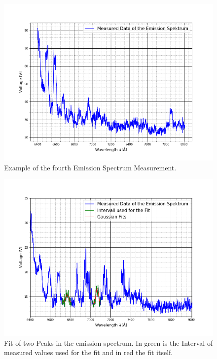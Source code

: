 \begin{figure}[ht]
	\includegraphics[scale=0.5]{Bild/E4}
	\centering
	\caption{Example of the fourth Emission Spectrum Measurement.}
\end{figure}
\begin{figure}[ht]
	\includegraphics[scale=0.5]{Bild/E3_2}
	\centering
	\caption[Fit of two Peaks in the Emission Spectrum]{Fit of two Peaks in the emission spectrum. In green is the Interval of measured values used for the fit and in red the fit itself.}
	\label{figGausEm}
\end{figure}
